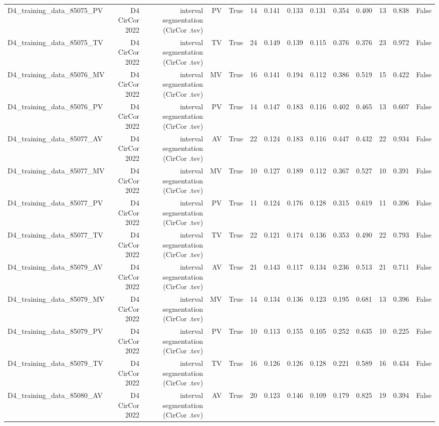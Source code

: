 \begin{table}[htbp]
\begin{tabular}{lrrrrrrrrrrrrr}
    D4\_training\_data\_85075\_PV & D4 CirCor 2022 & interval segmentation (CirCor .tsv) & PV & True & 14 & 0.141 & 0.133 & 0.131 & 0.354 & 0.400 & 13 & 0.838 & False \\
    D4\_training\_data\_85075\_TV & D4 CirCor 2022 & interval segmentation (CirCor .tsv) & TV & True & 24 & 0.149 & 0.139 & 0.115 & 0.376 & 0.376 & 23 & 0.972 & False \\
    D4\_training\_data\_85076\_MV & D4 CirCor 2022 & interval segmentation (CirCor .tsv) & MV & True & 16 & 0.141 & 0.194 & 0.112 & 0.386 & 0.519 & 15 & 0.422 & False \\
    D4\_training\_data\_85076\_PV & D4 CirCor 2022 & interval segmentation (CirCor .tsv) & PV & True & 14 & 0.147 & 0.183 & 0.116 & 0.402 & 0.465 & 13 & 0.607 & False \\
    D4\_training\_data\_85077\_AV & D4 CirCor 2022 & interval segmentation (CirCor .tsv) & AV & True & 22 & 0.124 & 0.183 & 0.116 & 0.447 & 0.432 & 22 & 0.934 & False \\
    D4\_training\_data\_85077\_MV & D4 CirCor 2022 & interval segmentation (CirCor .tsv) & MV & True & 10 & 0.127 & 0.189 & 0.112 & 0.367 & 0.527 & 10 & 0.391 & False \\
    D4\_training\_data\_85077\_PV & D4 CirCor 2022 & interval segmentation (CirCor .tsv) & PV & True & 11 & 0.124 & 0.176 & 0.128 & 0.315 & 0.619 & 11 & 0.396 & False \\
    D4\_training\_data\_85077\_TV & D4 CirCor 2022 & interval segmentation (CirCor .tsv) & TV & True & 22 & 0.121 & 0.174 & 0.136 & 0.353 & 0.490 & 22 & 0.793 & False \\
    D4\_training\_data\_85079\_AV & D4 CirCor 2022 & interval segmentation (CirCor .tsv) & AV & True & 21 & 0.143 & 0.117 & 0.134 & 0.236 & 0.513 & 21 & 0.711 & False \\
    D4\_training\_data\_85079\_MV & D4 CirCor 2022 & interval segmentation (CirCor .tsv) & MV & True & 14 & 0.134 & 0.136 & 0.123 & 0.195 & 0.681 & 13 & 0.396 & False \\
    D4\_training\_data\_85079\_PV & D4 CirCor 2022 & interval segmentation (CirCor .tsv) & PV & True & 10 & 0.113 & 0.155 & 0.105 & 0.252 & 0.635 & 10 & 0.225 & False \\
    D4\_training\_data\_85079\_TV & D4 CirCor 2022 & interval segmentation (CirCor .tsv) & TV & True & 16 & 0.126 & 0.126 & 0.128 & 0.221 & 0.589 & 16 & 0.434 & False \\
    D4\_training\_data\_85080\_AV & D4 CirCor 2022 & interval segmentation (CirCor .tsv) & AV & True & 20 & 0.123 & 0.146 & 0.109 & 0.179 & 0.825 & 19 & 0.394 & False \\

\end{tabular}
\end{table}
